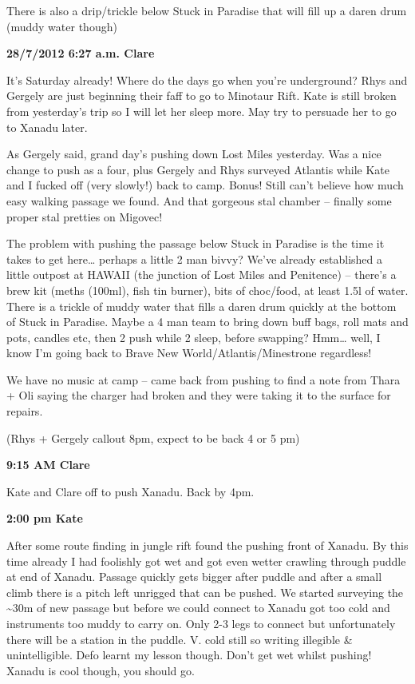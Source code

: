 There is also a drip/trickle below Stuck in Paradise that will fill up a
daren drum (muddy water though)

\textbf{28/7/2012 6:27 a.m. Clare}

It's Saturday already! Where do the days go when you're underground?
Rhys and Gergely are just beginning their faff to go to Minotaur Rift.
Kate is still broken from yesterday's trip so I will let her sleep more.
May try to persuade her to go to Xanadu later.

As Gergely said, grand day's pushing down Lost Miles yesterday. Was a
nice change to push as a four, plus Gergely and Rhys surveyed Atlantis
while Kate and I fucked off (very slowly!) back to camp. Bonus! Still
can't believe how much easy walking passage we found. And that gorgeous
stal chamber -- finally some proper stal pretties on Migovec!

The problem with pushing the passage below Stuck in Paradise is the time
it takes to get here\ldots{} perhaps a little 2 man bivvy? We've already
established a little outpost at HAWAII (the junction of Lost Miles and
Penitence) -- there's a brew kit (meths (100ml), fish tin burner), bits
of choc/food, at least 1.5l of water. There is a trickle of muddy water
that fills a daren drum quickly at the bottom of Stuck in Paradise.
Maybe a 4 man team to bring down buff bags, roll mats and pots, candles
etc, then 2 push while 2 sleep, before swapping? Hmm\ldots{} well, I
know I'm going back to Brave New World/Atlantis/Minestrone regardless!

We have no music at camp -- came back from pushing to find a note from
Thara + Oli saying the charger had broken and they were taking it to the
surface for repairs.

(Rhys + Gergely callout 8pm, expect to be back 4 or 5 pm)

\textbf{9:15 AM Clare}

Kate and Clare off to push Xanadu. Back by 4pm.

\textbf{2:00 pm Kate}

After some route finding in jungle rift found the pushing front of
Xanadu. By this time already I had foolishly got wet and got even wetter
crawling through puddle at end of Xanadu. Passage quickly gets bigger
after puddle and after a small climb there is a pitch left unrigged that
can be pushed. We started surveying the \textasciitilde{}30m of new
passage but before we could connect to Xanadu got too cold and
instruments too muddy to carry on. Only 2-3 legs to connect but
unfortunately there will be a station in the puddle. V. cold still so
writing illegible \& unintelligible. Defo learnt my lesson though. Don't
get wet whilst pushing! Xanadu is cool though, you should go.

